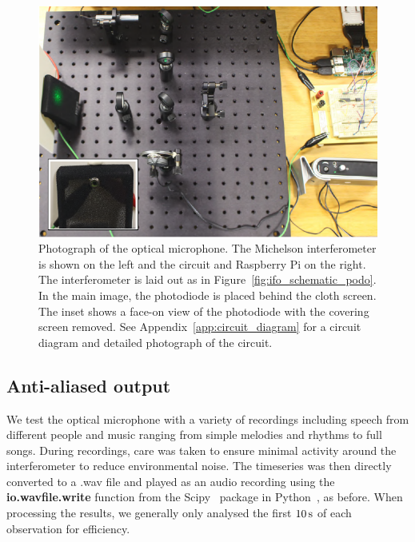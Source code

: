 \documentclass[paper-main.tex]{subfiles}
\begin{document}
\begin{figure}
	\includegraphics[width=.7\textwidth]{figures/setup_pic2.pdf}
\caption{Photograph of the optical microphone. The Michelson interferometer is shown on the left and the circuit and Raspberry Pi on the right. The interferometer is laid out as in Figure~\ref{fig:ifo_schematic_podo}. In the main image, the photodiode is placed behind the cloth screen. The inset shows a face-on view of the photodiode with the covering screen removed. See Appendix~\ref{app:circuit_diagram} for a circuit diagram and detailed photograph of the circuit.}
	\label{fig:setup_pic2}
\end{figure}


\subsection{Anti-aliased output}
\label{sec:initialResultsOpMic}

We test the optical microphone with a variety of recordings including speech from different people and music ranging from simple melodies and rhythms to full songs. 
During recordings, care was taken to ensure minimal activity around the interferometer to reduce environmental noise. 
The timeseries was then directly converted to a .wav file and played as an audio recording using the \textbf{io.wavfile.write} function from the Scipy~\cite{scipy} package in Python~\cite{python}, as before.
When processing the results, we generally only analysed the first $10\,{\rm s}$ of each observation for efficiency.
\end{document}
